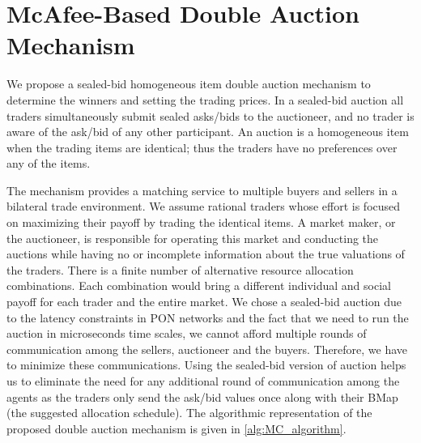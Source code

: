 \section{McAfee-Based Double Auction Mechanism}
\label{sec:auction_mechanism}
We propose a sealed-bid homogeneous item double auction mechanism to determine the winners and setting the trading prices. In a sealed-bid auction all traders simultaneously submit sealed asks/bids to the auctioneer, and no trader is aware of the ask/bid of any other participant. An auction is a homogeneous item when the trading items are identical; thus the traders have no preferences over any of the items.


The mechanism provides a matching service to multiple buyers and sellers in a bilateral trade environment. We assume rational traders whose effort is focused on maximizing their payoff by trading the identical items. A market maker, or the auctioneer, is responsible for operating this market and conducting the auctions while having no or incomplete information about the true valuations of the traders. There is a finite number of alternative resource allocation combinations. Each combination would bring a different individual and social payoff for each trader and the entire market.
We chose a sealed-bid auction due to the latency constraints in \ac{PON} networks and the fact that we need to run the auction in microseconds time scales, we cannot afford multiple rounds of communication among the sellers, auctioneer and the buyers. Therefore, we have to minimize these communications. Using the sealed-bid version of auction helps us to eliminate the need for any additional round of communication among the agents as the traders only send the ask/bid values once along with their \ac{BMap} (the suggested allocation schedule). The algorithmic representation of the proposed double auction mechanism is given in \autoref{alg:MC_algorithm}.


